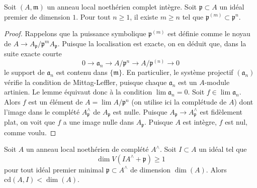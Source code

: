 \begin{lemma}
\label{lemma-inverse-system-symbolic-powers}
Soit $(A, \mathfrak m)$ un anneau local noethérien complet intègre. Soit $\mathfrak p \subset A$ un idéal premier de dimension $1$. Pour tout $n \geq 1$, il existe $m \geq n$ tel que $\mathfrak p^{(m)} \subset \mathfrak p^n$.
\end{lemma}

\begin{proof}
Rappelons que la puissance symbolique $\mathfrak p^{(m)}$ est définie comme le noyau de $A \to A_\mathfrak p/\mathfrak p^mA_\mathfrak p$. Puisque la localisation est exacte, on en déduit que, dans la suite exacte courte
$$
0 \to \mathfrak a_n \to A/\mathfrak p^n \to A/\mathfrak p^{(n)} \to 0
$$
le support de $\mathfrak a_n$ est contenu dans $\{\mathfrak m\}$. En particulier, le système projectif $(\mathfrak a_n)$ vérifie la condition de Mittag-Leffler, puisque chaque $\mathfrak a_n$ est un $A$-module artinien. Le lemme équivaut donc à la condition $\lim \mathfrak a_n = 0$. Soit $f \in \lim \mathfrak a_n$. Alors $f$ est un élément de $A = \lim A/\mathfrak p^n$ (on utilise ici la complétude de $A$) dont l'image dans le complété $A_\mathfrak p^\wedge$ de $A_\mathfrak p$ est nulle. Puisque $A_\mathfrak p \to A_\mathfrak p^\wedge$ est fidèlement plat, on voit que $f$ a une image nulle dans $A_\mathfrak p$. Puisque $A$ est intègre, $f$ est nul, comme voulu.
\end{proof}

\begin{proposition}
\label{proposition-Hartshorne-Lichtenbaum-vanishing}
\begin{reference}
\cite[Theorem 3.1]{CD}
\end{reference}
Soit $A$ un anneau local noethérien de complété $A^\wedge$. Soit $I \subset A$ un idéal tel que
$$
\dim V(IA^\wedge + \mathfrak p) \geq 1
$$
pour tout idéal premier minimal $\mathfrak p \subset A^\wedge$ de dimension $\dim(A)$. Alors $\text{cd}(A, I) < \dim(A)$.
\end{proposition}

